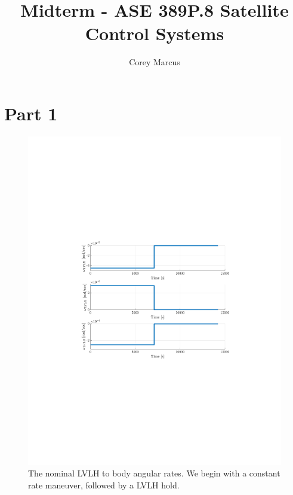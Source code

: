 \documentclass[]{article}
\title{Midterm - ASE 389P.8 Satellite Control Systems}
\author{Corey Marcus}
\begin{document}
\maketitle

\newcommand{\CrossProd}[1]{\left[ #1 \times \right]}

\section{Part 1}

\begin{figure}[!h]
	\centering
	\includegraphics[width=\linewidth,trim={4cm, 8cm, 4cm, 8cm},clip]{figs/P1Q1.pdf}
	\caption{The nominal LVLH to body angular rates. We begin with a constant rate maneuver, followed by a LVLH hold.}
	\label{fig:P1Q1}
\end{figure}
\end{document}
